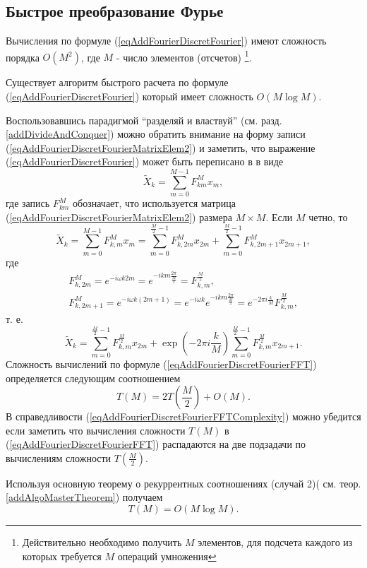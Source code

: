 \subsection{Быстрое преобразование Фурье}
Вычисления по формуле (\ref{eqAddFourierDiscretFourier}) имеют
сложность порядка $O\left(M^2\right)$, где $M$ - число элементов (отсчетов)
\footnote{Действительно необходимо получить $M$ элементов, для
  подсчета каждого из которых требуется $M$ операций умножения}. 

Существует алгоритм быстрого расчета по формуле
(\ref{eqAddFourierDiscretFourier}) который имеет сложность
$O\left(M \log{M}\right)$.

Воспользовавшись парадигмой ``разделяй и властвуй''
(см. разд. \ref{addDivideAndConquer}) можно 
обратить внимание на форму записи
(\ref{eqAddFourierDiscretFourierMatrixElem2}) и 
заметить, что выражение
(\ref{eqAddFourierDiscretFourier}) может быть переписано в
в виде 
\begin{equation}
\tilde{X}_k = \sum^{M - 1}_{m = 0} F_{km}^{M} x_m,
\nonumber
\end{equation}
где запись $F_{km}^{M}$ обозначает, что используется матрица
(\ref{eqAddFourierDiscretFourierMatrixElem2}) размера $M\times M$.
Если $M$ четно, то 
\begin{equation}
\tilde{X}_k = \sum^{M - 1}_{m = 0} F_{k,m}^{M} x_m = 
\sum^{\frac{M}{2} - 1}_{m = 0} F_{k,2m}^M x_{2m} +
\sum^{\frac{M}{2} - 1}_{m = 0} F_{k,2m + 1}^M x_{2m + 1},
\nonumber
\end{equation}
где
\begin{eqnarray}
F_{k,2m}^{M} = e^{-i \omega k 2m} = e^{-i k m \frac{2\pi}{\frac{M}{2}}
} = F_{k,m}^{\frac{M}{2}},
\nonumber \\
F_{k,2m + 1}^{M} = e^{-i \omega k \left(2m+1\right)} = 
e^{-i \omega k}e^{-i k m \frac{2\pi}{\frac{M}{2}}} = 
e^{-2\pi i \frac{k}{M}}F_{k,m}^{\frac{M}{2}},
\nonumber
\end{eqnarray}
т. е.
\begin{equation}
\tilde{X}_k = \sum^{\frac{M}{2} - 1}_{m = 0} F_{k,m}^{\frac{M}{2}} x_{2m} +
\exp{\left(-2\pi i \frac{k}{M}\right)}
\sum^{\frac{M}{2} - 1}_{m = 0}  F_{k,m}^{\frac{M}{2}} x_{2m + 1}.
\label{eqAddFourierDiscretFourierFFT}
\end{equation}
Сложность вычислений по формуле
(\ref{eqAddFourierDiscretFourierFFT}) определяется 
следующим соотношением
\begin{equation}
T\left( M \right) = 2 T\left( \frac{M}{2} \right) + O\left( M \right).
\label{eqAddFourierDiscretFourierFFTComplexity}
\end{equation}
В справедливости
(\ref{eqAddFourierDiscretFourierFFTComplexity}) можно убедится
если заметить что вычисления сложности $T\left( M \right)$ в 
(\ref{eqAddFourierDiscretFourierFFT}) распадаются 
на две подзадачи по вычислениям сложности $T\left( \frac{M}{2}
\right)$.

Используя основную теорему о рекуррентных соотношениях (случай 2)(
см. теор. \ref{addAlgoMasterTheorem}) 
получаем 
\begin{equation}
T\left( M \right) = O\left( M \log{M} \right).
\nonumber
\end{equation}

